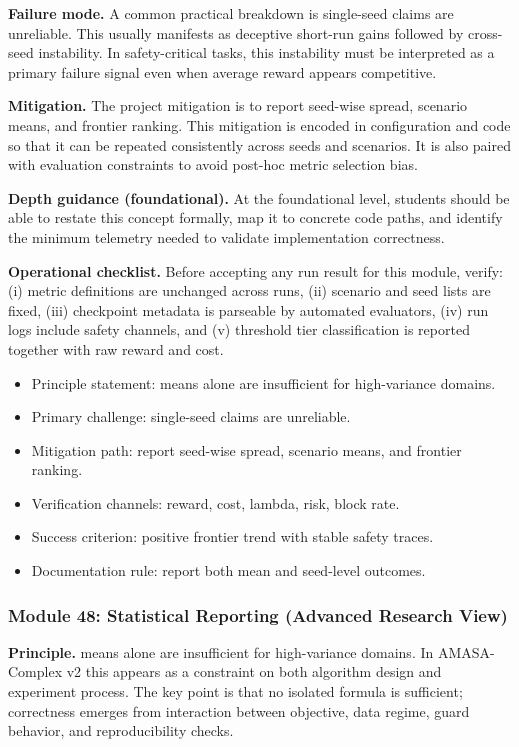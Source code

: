 \documentclass[conference]{IEEEtran}
\begin{document}
\textbf{Failure mode.} A common practical breakdown is single-seed claims are unreliable. This usually manifests as deceptive short-run gains followed by cross-seed instability. In safety-critical tasks, this instability must be interpreted as a primary failure signal even when average reward appears competitive.

\textbf{Mitigation.} The project mitigation is to report seed-wise spread, scenario means, and frontier ranking. This mitigation is encoded in configuration and code so that it can be repeated consistently across seeds and scenarios. It is also paired with evaluation constraints to avoid post-hoc metric selection bias.

\textbf{Depth guidance (foundational).} At the foundational level, students should be able to restate this concept formally, map it to concrete code paths, and identify the minimum telemetry needed to validate implementation correctness.

\textbf{Operational checklist.} Before accepting any run result for this module, verify: (i) metric definitions are unchanged across runs, (ii) scenario and seed lists are fixed, (iii) checkpoint metadata is parseable by automated evaluators, (iv) run logs include safety channels, and (v) threshold tier classification is reported together with raw reward and cost.

\begin{itemize}[leftmargin=*]
  \item Principle statement: means alone are insufficient for high-variance domains.
  \item Primary challenge: single-seed claims are unreliable.
  \item Mitigation path: report seed-wise spread, scenario means, and frontier ranking.
  \item Verification channels: reward, cost, lambda, risk, block rate.
  \item Success criterion: positive frontier trend with stable safety traces.
  \item Documentation rule: report both mean and seed-level outcomes.
\end{itemize}


\subsubsection{Module 48: Statistical Reporting (Advanced Research View)}
\textbf{Principle.} means alone are insufficient for high-variance domains. In AMASA-Complex v2 this appears as a constraint on both algorithm design and experiment process. The key point is that no isolated formula is sufficient; correctness emerges from interaction between objective, data regime, guard behavior, and reproducibility checks.
\end{document}
